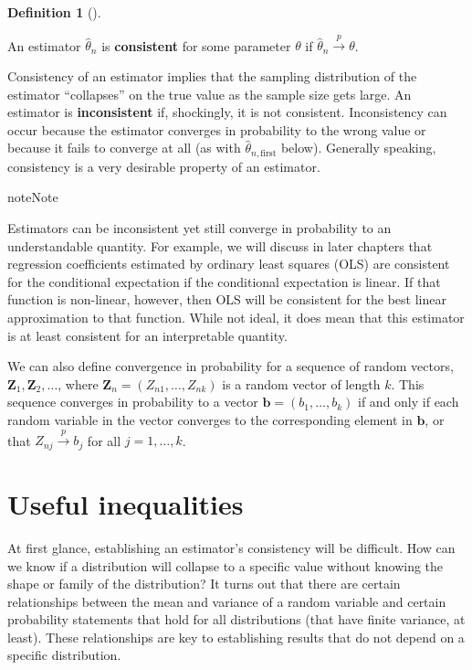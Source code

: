 \documentclass[
  13pt,
  letterpaper,
  DIV=11,
  numbers=noendperiod]{scrreprt}
\newcommand{\mb}{\bm}
\newcommand{\inprob}{\overset{p}{\to}}
\theoremstyle{plain}
\theoremstyle{plain}
\theoremstyle{definition}
\newtheorem{definition}{Definition}[chapter]
\theoremstyle{definition}
\theoremstyle{remark}
\begin{document}
\begin{definition}[]\protect\hypertarget{def-consistency}{}\label{def-consistency}

An estimator \(\widehat{\theta}_n\) is \textbf{consistent} for some
parameter \(\theta\) if \(\widehat{\theta}_n \inprob \theta\).

\end{definition}

Consistency of an estimator implies that the sampling distribution of
the estimator ``collapses'' on the true value as the sample size gets
large. An estimator is \textbf{inconsistent} if, shockingly, it is not
consistent. Inconsistency can occur because the estimator converges in
probability to the wrong value or because it fails to converge at all
(as with \(\widehat{\theta}_{n, \text{first}}\) below). Generally
speaking, consistency is a very desirable property of an estimator.

\begin{bookcallout}{note}{Note}

Estimators can be inconsistent yet still converge in probability to an
understandable quantity. For example, we will discuss in later chapters
that regression coefficients estimated by ordinary least squares (OLS)
are consistent for the conditional expectation if the conditional
expectation is linear. If that function is non-linear, however, then OLS
will be consistent for the best linear approximation to that function.
While not ideal, it does mean that this estimator is at least consistent
for an interpretable quantity.

\end{bookcallout}

We can also define convergence in probability for a sequence of random
vectors, \(\mb{Z}_1, \mb{Z}_2, \ldots\), where
\(\mb{Z}_n = (Z_{n1}, \ldots, Z_{nk})\) is a random vector of length
\(k\). This sequence converges in probability to a vector
\(\mb{b} = (b_1, \ldots, b_k)\) if and only if each random variable in
the vector converges to the corresponding element in \(\mb{b}\), or that
\(Z_{nj} \inprob b_j\) for all \(j = 1, \ldots, k\).

\section{Useful inequalities}\label{useful-inequalities}

At first glance, establishing an estimator's consistency will be
difficult. How can we know if a distribution will collapse to a specific
value without knowing the shape or family of the distribution? It turns
out that there are certain relationships between the mean and variance
of a random variable and certain probability statements that hold for
all distributions (that have finite variance, at least). These
relationships are key to establishing results that do not depend on a
specific distribution.
\end{document}
